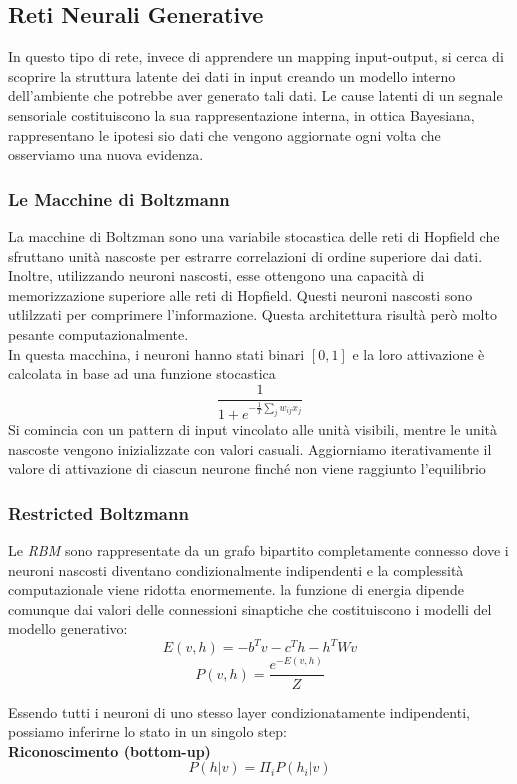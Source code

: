 \documentclass[12pt, a4paper]{article}
\begin{document}
\subsection{Reti Neurali Generative}
In questo tipo di rete, invece di apprendere un mapping input-output, si cerca di scoprire la struttura latente dei dati in input creando un modello interno dell'ambiente che potrebbe aver generato tali dati. Le cause latenti di un segnale sensoriale costituiscono la sua rappresentazione interna, in ottica Bayesiana, rappresentano le ipotesi sio dati che vengono aggiornate ogni volta che osserviamo una nuova evidenza.\\

\subsubsection{Le Macchine di Boltzmann}
La macchine di Boltzman sono una variabile stocastica delle reti di Hopfield che sfruttano unità nascoste per estrarre correlazioni di ordine superiore dai dati. Inoltre, utilizzando neuroni nascosti, esse ottengono una capacità di memorizzazione superiore alle reti di Hopfield. Questi neuroni nascosti sono utlilzzati per comprimere l'informazione. Questa architettura risultà però molto pesante computazionalmente.
\\
In questa macchina, i neuroni hanno stati binari \([0, 1]\) e la loro attivazione è calcolata in base ad una funzione stocastica
\[\frac{1}{1+e^{-\frac{1}{T} \sum_j w_{ij}x_j}}\]
Si comincia con un pattern di input vincolato alle unità visibili, mentre le unità nascoste vengono inizializzate con valori casuali. Aggiorniamo iterativamente il valore di attivazione di ciascun neurone finché non viene raggiunto l'equilibrio

\subsubsection{Restricted Boltzmann}
Le \textit{RBM} sono rappresentate da un grafo bipartito completamente connesso dove i neuroni nascosti diventano condizionalmente indipendenti e la complessità computazionale viene ridotta enormemente. la funzione di energia dipende comunque dai valori delle connessioni sinaptiche che costituiscono i modelli del modello generativo:
\[E(v, h) = -b^Tv-c^Th-h^TWv\]
\[P(v, h) = \frac{e^{-E(v,h)}}{Z}\]

Essendo tutti i neuroni di uno stesso layer condizionatamente indipendenti, possiamo inferirne lo stato in un singolo step:\\
\textbf{Riconoscimento (bottom-up)}
\[P(h|v) = \Pi_i P(h_i|v)\]
\end{document}
